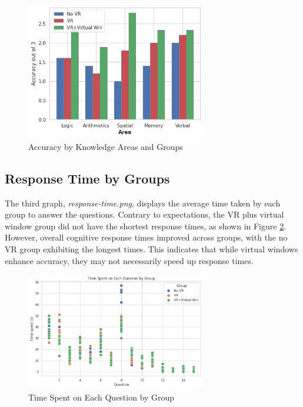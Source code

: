\documentclass[runningheads]{llncs}
\begin{document}
\begin{figure}[!htbp]
    \centering
    \includegraphics[width=0.7\textwidth]{img/accuracy-by-areas-and-groups.png}
    \caption{Accuracy by Knowledge Areas and Groups}
    \label{fig:accuracy-by-areas-and-groups}
\end{figure}

\subsection{Response Time by Groups}

The third graph, \textit{response-time.png}, displays the average time taken by each group to answer the questions. Contrary to expectations, the VR plus virtual window group did not have the shortest response times, as shown in Figure \ref{fig:response-time}. However, overall cognitive response times improved across groups, with the no VR group exhibiting the longest times. This indicates that while virtual windows enhance accuracy, they may not necessarily speed up response times.

\begin{figure}[!htbp]
    \centering
    \includegraphics[width=0.7\textwidth]{img/response-time.png}
    \caption{Time Spent on Each Question by Group}
    \label{fig:response-time}
\end{figure}
\end{document}

